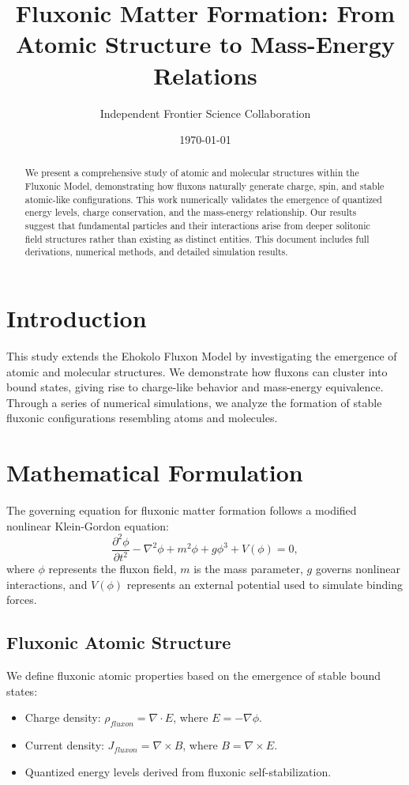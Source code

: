 \documentclass{article}
\title{Fluxonic Matter Formation: From Atomic Structure to Mass-Energy Relations}
\author{Independent Frontier Science Collaboration}
\date{\today}
\begin{document}
\maketitle

\begin{abstract}
We present a comprehensive study of atomic and molecular structures within the Fluxonic Model, demonstrating how fluxons naturally generate charge, spin, and stable atomic-like configurations. This work numerically validates the emergence of quantized energy levels, charge conservation, and the mass-energy relationship. Our results suggest that fundamental particles and their interactions arise from deeper solitonic field structures rather than existing as distinct entities. This document includes full derivations, numerical methods, and detailed simulation results.
\end{abstract}

\section{Introduction}
This study extends the Ehokolo Fluxon Model by investigating the emergence of atomic and molecular structures. We demonstrate how fluxons can cluster into bound states, giving rise to charge-like behavior and mass-energy equivalence. Through a series of numerical simulations, we analyze the formation of stable fluxonic configurations resembling atoms and molecules.

\section{Mathematical Formulation}
The governing equation for fluxonic matter formation follows a modified nonlinear Klein-Gordon equation:
\begin{equation}
\frac{\partial^2 \phi}{\partial t^2} - \nabla^2 \phi + m^2 \phi + g \phi^3 + V(\phi) = 0,
\end{equation}
where $\phi$ represents the fluxon field, $m$ is the mass parameter, $g$ governs nonlinear interactions, and $V(\phi)$ represents an external potential used to simulate binding forces.

\subsection{Fluxonic Atomic Structure}
We define fluxonic atomic properties based on the emergence of stable bound states:
\begin{itemize}
    \item Charge density: $\rho_{fluxon} = \nabla \cdot E$, where $E = -\nabla \phi$.
    \item Current density: $J_{fluxon} = \nabla \times B$, where $B = \nabla \times E$.
    \item Quantized energy levels derived from fluxonic self-stabilization.
\end{itemize}
\end{document}
